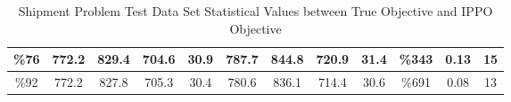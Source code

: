 \documentclass[12pt]{article}
\begin{document}
\begin{table}
{\begin{tabular}{|c|c|c|c|c|c|c|c|c|c|c|c|}
\%76                                                                                               & 772.2         & 829.4        & 704.6        & 30.9            & 787.7         & 844.8        & 720.9        & 31.4            & \%343                                   & 0.13                         &15                                                                         \\ \hline
\%92                                                                                               & 772.2         & 827.8        & 705.3        & 30.4            & 780.6         & 836.1        & 714.4        & 30.6            & \%691                                   & 0.08                        &13                                                                          \\ \hline\end{tabular}}
\caption{Shipment Problem Test Data Set Statistical Values between True Objective and IPPO Objective} 
\label{tab:table4}
\end{table} 
\end{document}
